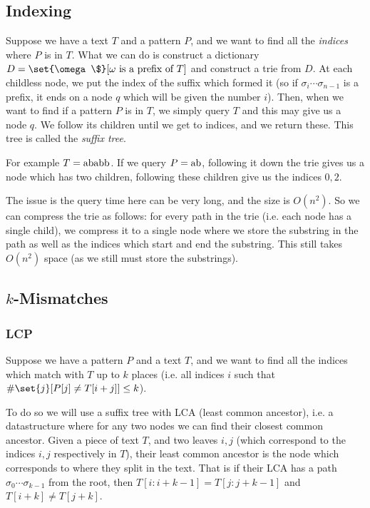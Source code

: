 \subsection{Indexing}

Suppose we have a text $T$ and a pattern $P$, and we want to find all the {\it indices} where $P$ is in $T$.
What we can do is construct a dictionary $D=\set{\omega\$}[\hbox{$\omega$ is a prefix of $T$}]$ and construct a trie from $D$.
At each childless node, we put the index of the suffix which formed it (so if $\sigma_i\cdots\sigma_{n-1}$ is a prefix, it ends on a node $q$ which will be given the number $i$).
Then, when we want to find if a pattern $P$ is in $T$, we simply query $T$ and this may give us a node $q$.
We follow its children until we get to indices, and we return these.
This tree is called the {\it suffix tree}.

For example $T={\rm ababb}$.
If we query $P={\rm ab}$, following it down the trie gives us a node which has two children, following these children give us the indices $0,2$.

The issue is the query time here can be very long, and the size is $O(n^2)$.
So we can compress the trie as follows: for every path in the trie (i.e. each node has a single child), we compress it to a single node where we store the substring in the path as well as the indices which
start and end the substring.
This still takes $O(n^2)$ space (as we still must store the substrings).

\subsection{$k$-Mismatches}

\subsubsection{LCP}

Suppose we have a pattern $P$ and a text $T$, and we want to find all the indices which match with $T$ up to $k$ places (i.e. all indices $i$ such that $\#\set{j}[{P[j]\neq T[i+j]}]\leq k$).

To do so we will use a suffix tree with LCA (least common ancestor), i.e. a datastructure where for any two nodes we can find their closest common ancestor.
Given a piece of text $T$, and two leaves $i,j$ (which correspond to the indices $i,j$ respectively in $T$), their least common ancestor is the node which corresponds to where they split in the text.
That is if their LCA has a path $\sigma_0\cdots\sigma_{k-1}$ from the root, then $T[i:i+k-1]=T[j:j+k-1]$ and $T[i+k]\neq T[j+k]$.

